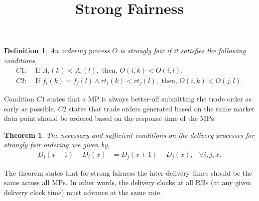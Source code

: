 \documentclass{article}
\title{Strong Fairness}
\date{\vspace{-5ex}}
\newtheorem{definition}{Definition}
\newtheorem{theorem}{Theorem}
\begin{document}
\maketitle

\begin{definition}
An ordering process $O$ is strongly fair if it satisfies the following conditions,
\begin{align*}
    C1: &\text{ If } A_i(k) < A_i(l), \text{ then, } O(i,k) < O(i,l).\nonumber\\
    C2: &\text{ If } f_i(k) = f_j(l) \land rt_i(k) < rt_j(l), \text{ then, }
    O(i,k) < O(j,l).
\end{align*}
\label{def:strong}
\vspace{-5mm}
\end{definition}

Condition $C1$ states that a MP is always better-off submitting the trade order as early as possible. $C2$ states that trade orders generated based on the same market data point should be ordered based on the response time of the MPs.%

\begin{theorem}
    The \textit{necessary} and \textit{sufficient} conditions on the delivery processes for strongly fair ordering are given by,
    \begin{align*}
        D_i(x+1) - D_i(x) &= D_j(x+1) - D_j(x), & \forall i,j,x.
    \end{align*}
    \label{thm:1}
    \vspace{-6mm}
\end{theorem}

The theorem states that for strong fairness the inter-delivery times should be the same across all  MPs. In other words, the delivery clocks at all RBs (at any given delivery clock time) must advance at the same rate.
\end{document}
